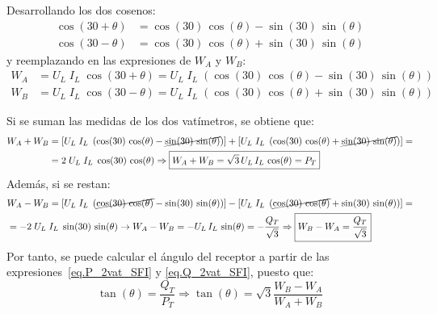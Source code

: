 \documentclass[11pt]{book} %
\numberwithin{dummy}{section}
\theoremstyle{ocrenumbox}
\theoremstyle{blacknumex}
\theoremstyle{blacknumbox}
\theoremstyle{ocrenum}
\begin{document}
	Desarrollando los dos cosenos:
\begin{align*}
  \cos({30} + \theta) &= \cos({30})\,\cos(\theta) - \sin({30})\,\sin(\theta)\\
  \cos({30} - \theta) &= \cos({30})\,\cos(\theta) + \sin({30})\,\sin(\theta)
\end{align*}
y reemplazando en las expresiones de $W_A$ y $W_B$:
\begin{align*}
    W_A&=U_L\;I_L\;\cos{(30+\theta)}=U_L\;I_L\;\left( \cos({30})\,\cos(\theta) - \sin({30})\,\sin(\theta)\right)\\
    W_B&=U_L\;I_L\;\cos{(30-\theta)}=U_L\;I_L\;\left( \cos({30})\,\cos(\theta) + \sin({30})\,\sin(\theta)\right)
\end{align*}

Si se suman las medidas de los dos vatímetros, se obtiene que:
\begin{align}\label{eq.P_2vat_SFI}
    W_A+W_B&=\left[U_L\;I_L\;\left( \cos({30})\,\cos(\theta) - \cancel{\sin({30})\,\sin(\theta)}\right) \right] + \left[U_L\;I_L\;\left( \cos({30})\,\cos(\theta) + \cancel{\sin({30})\,\sin(\theta)}\right) \right]=\nonumber\\
    &= 2\; U_L\;I_L\;\cos({30})\,\cos(\theta) \Rightarrow \boxed{W_A + W_B = \sqrt{3}\,U_L\, I_L\,\cos(\theta) = P_T}
\end{align}
Además, si se restan: 
\begin{align}\label{eq.Q_2vat_SFI}
    &W_A-W_B=\left[ U_L\;I_L\;\left( \cancel{\cos({30})\,\cos(\theta)} - \sin({30})\,\sin(\theta)\right) \right] - \left[U_L\;I_L\;\left( \cancel{\cos({30})\,\cos(\theta)} + \sin({30})\,\sin(\theta)\right)\right]=\nonumber\\
    &= -2\; U_L\;I_L\;\sin({30})\,\sin(\theta) \rightarrow W_A - W_B = -U_L\, I_L\,\sin(\theta) = -\dfrac{Q_T}{\sqrt{3}} \Rightarrow \boxed{W_B - W_A = \dfrac{Q_T}{\sqrt{3}}}
\end{align}
Por tanto, se puede calcular el ángulo del receptor a partir de las expresiones~\eqref{eq.P_2vat_SFI} y \eqref{eq.Q_2vat_SFI}, puesto que:
\begin{equation}
    \tan(\theta) = \dfrac{Q_T}{P_T}\Rightarrow \boxed{\tan(\theta) = \sqrt{3} \frac{W_B - W_A}{W_A + W_B}}
\end{equation}
\end{document}
